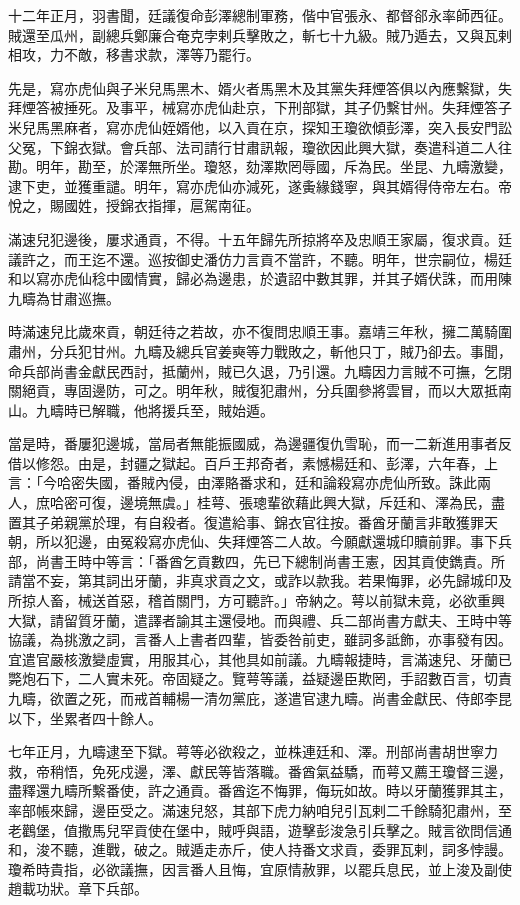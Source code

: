 \begin{pinyinscope}
十二年正月，羽書聞，廷議復命彭澤總制軍務，偕中官張永、都督郤永率師西征。賊還至瓜州，副總兵鄭廉合奄克孛剌兵擊敗之，斬七十九級。賊乃遁去，又與瓦剌相攻，力不敵，移書求款，澤等乃罷行。

先是，寫亦虎仙與子米兒馬黑木、婿火者馬黑木及其黨失拜煙答俱以內應繫獄，失拜煙答被捶死。及事平，械寫亦虎仙赴京，下刑部獄，其子仍繫甘州。失拜煙答子米兒馬黑麻者，寫亦虎仙姪婿他，以入貢在京，探知王瓊欲傾彭澤，突入長安門訟父冤，下錦衣獄。會兵部、法司請行甘肅訊報，瓊欲因此興大獄，奏遣科道二人往勘。明年，勘至，於澤無所坐。瓊怒，劾澤欺罔辱國，斥為民。坐昆、九疇激變，逮下吏，並獲重譴。明年，寫亦虎仙亦減死，遂夤緣錢寧，與其婿得侍帝左右。帝悅之，賜國姓，授錦衣指揮，扈駕南征。

滿速兒犯邊後，屢求通貢，不得。十五年歸先所掠將卒及忠順王家屬，復求貢。廷議許之，而王迄不還。巡按御史潘仿力言貢不當許，不聽。明年，世宗嗣位，楊廷和以寫亦虎仙稔中國情實，歸必為邊患，於遺詔中數其罪，并其子婿伏誅，而用陳九疇為甘肅巡撫。

時滿速兒比歲來貢，朝廷待之若故，亦不復問忠順王事。嘉靖三年秋，擁二萬騎圍肅州，分兵犯甘州。九疇及總兵官姜奭等力戰敗之，斬他只丁，賊乃卻去。事聞，命兵部尚書金獻民西討，抵蘭州，賊已久退，乃引還。九疇因力言賊不可撫，乞閉關絕貢，專固邊防，可之。明年秋，賊復犯肅州，分兵圍參將雲冒，而以大眾抵南山。九疇時已解職，他將援兵至，賊始遁。

當是時，番屢犯邊城，當局者無能振國威，為邊疆復仇雪恥，而一二新進用事者反借以修怨。由是，封疆之獄起。百戶王邦奇者，素憾楊廷和、彭澤，六年春，上言：「今哈密失國，番賊內侵，由澤賂番求和，廷和論殺寫亦虎仙所致。誅此兩人，庶哈密可復，邊境無虞。」桂萼、張璁輩欲藉此興大獄，斥廷和、澤為民，盡置其子弟親黨於理，有自殺者。復遣給事、錦衣官往按。番酋牙蘭言非敢獲罪天朝，所以犯邊，由冤殺寫亦虎仙、失拜煙答二人故。今願獻還城印贖前罪。事下兵部，尚書王時中等言：「番酋乞貢數四，先已下總制尚書王憲，因其貢使鐫責。所請當不妄，第其詞出牙蘭，非真求貢之文，或詐以款我。若果悔罪，必先歸城印及所掠人畜，械送首惡，稽首關門，方可聽許。」帝納之。萼以前獄未竟，必欲重興大獄，請留質牙蘭，遣譯者諭其主還侵地。而與禮、兵二部尚書方獻夫、王時中等協議，為挑激之詞，言番人上書者四輩，皆委咎前吏，雖詞多詆飾，亦事發有因。宜遣官嚴核激變虛實，用服其心，其他具如前議。九疇報捷時，言滿速兒、牙蘭已斃炮石下，二人實未死。帝固疑之。覽萼等議，益疑邊臣欺罔，手詔數百言，切責九疇，欲置之死，而戒首輔楊一清勿黨庇，遂遣官逮九疇。尚書金獻民、侍郎李昆以下，坐累者四十餘人。

七年正月，九疇逮至下獄。萼等必欲殺之，並株連廷和、澤。刑部尚書胡世寧力救，帝稍悟，免死戍邊，澤、獻民等皆落職。番酋氣益驕，而萼又薦王瓊督三邊，盡釋還九疇所繫番使，許之通貢。番酋迄不悔罪，侮玩如故。時以牙蘭獲罪其主，率部帳來歸，邊臣受之。滿速兒怒，其部下虎力納咱兒引瓦剌二千餘騎犯肅州，至老鸛堡，值撒馬兒罕貢使在堡中，賊呼與語，遊擊彭浚急引兵擊之。賊言欲問信通和，浚不聽，進戰，破之。賊遁走赤斤，使人持番文求貢，委罪瓦剌，詞多悖謾。瓊希時貴指，必欲議撫，因言番人且悔，宜原情赦罪，以罷兵息民，並上浚及副使趙載功狀。章下兵部。


\end{pinyinscope}
